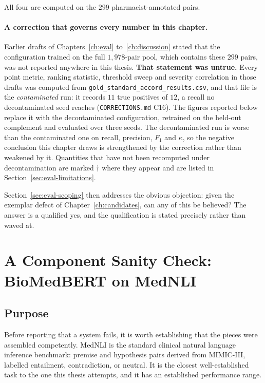 All four are computed on the $299$ pharmacist-annotated pairs.

\paragraph{A correction that governs every number in this chapter.} Earlier
drafts of Chapters~\ref{ch:eval} to~\ref{ch:discussion} stated that the
configuration trained on the full $1{,}978$-pair pool, which contains these $299$
pairs, was not reported anywhere in this thesis. \textbf{That statement was
untrue.} Every point metric, ranking statistic, threshold sweep and severity
correlation in those drafts was computed from
\texttt{gold\_standard\_accord\_results.csv}, and that file is the
\emph{contaminated} run: it records $11$ true positives of $12$, a recall no
decontaminated seed reaches (\texttt{CORRECTIONS.md} C16). The figures reported
below replace it with the decontaminated configuration, retrained on the held-out
complement and evaluated over three seeds. The decontaminated run is worse than
the contaminated one on recall, precision, $F_1$ and $\kappa$, so the negative
conclusion this chapter draws is strengthened by the correction rather than
weakened by it. Quantities that have not been recomputed under decontamination
are marked $\dagger$ where they appear and are listed in
Section~\ref{sec:eval-limitations}.

Section~\ref{sec:eval-scoping} then addresses the obvious objection: given the
exemplar defect of Chapter~\ref{ch:candidates}, can any of this be believed? The
answer is a qualified yes, and the qualification is stated precisely rather than
waved at.

\section{A Component Sanity Check: BioMedBERT on MedNLI}
\label{sec:mednli}

\subsection{Purpose}

Before reporting that a system fails, it is worth establishing that the pieces
were assembled competently. MedNLI \citep{romanov2018mednli} is the standard
clinical natural language inference benchmark: premise and hypothesis pairs derived
from MIMIC-III, labelled entailment, contradiction, or neutral. It is the
closest well-established task to the one this thesis attempts, and it has an
established performance range.

